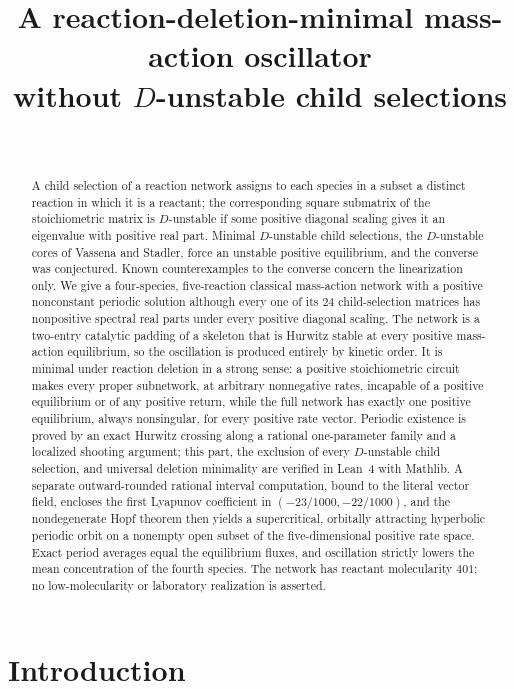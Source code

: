 \documentclass[11pt,a4paper]{article}
\title{A reaction-deletion-minimal mass-action oscillator\\ without $D$-unstable child selections}
\author{\PaperAuthor\\[2pt]\small\PaperAffiliation}
\date{\PaperDate}
\theoremstyle{plain}
\theoremstyle{definition}
\theoremstyle{remark}
\begin{document}
\maketitle

\begin{abstract}
A child selection of a reaction network assigns to each species in a subset a distinct reaction in which it is a reactant; the corresponding square submatrix of the stoichiometric matrix is $D$-unstable if some positive diagonal scaling gives it an eigenvalue with positive real part. Minimal $D$-unstable child selections, the $D$-unstable cores of Vassena and Stadler, force an unstable positive equilibrium, and the converse was conjectured. Known counterexamples to the converse concern the linearization only. We give a four-species, five-reaction classical mass-action network with a positive nonconstant periodic solution although every one of its $24$ child-selection matrices has nonpositive spectral real parts under every positive diagonal scaling. The network is a two-entry catalytic padding of a skeleton that is Hurwitz stable at every positive mass-action equilibrium, so the oscillation is produced entirely by kinetic order. It is minimal under reaction deletion in a strong sense: a positive stoichiometric circuit makes every proper subnetwork, at arbitrary nonnegative rates, incapable of a positive equilibrium or of any positive return, while the full network has exactly one positive equilibrium, always nonsingular, for every positive rate vector. Periodic existence is proved by an exact Hurwitz crossing along a rational one-parameter family and a localized shooting argument; this part, the exclusion of every $D$-unstable child selection, and universal deletion minimality are verified in Lean~4 with Mathlib. A separate outward-rounded rational interval computation, bound to the literal vector field, encloses the first Lyapunov coefficient in $(-23/1000,-22/1000)$, and the nondegenerate Hopf theorem then yields a supercritical, orbitally attracting hyperbolic periodic orbit on a nonempty open subset of the five-dimensional positive rate space. Exact period averages equal the equilibrium fluxes, and oscillation strictly lowers the mean concentration of the fourth species. The network has reactant molecularity $401$; no low-molecularity or laboratory realization is asserted.
\end{abstract}

\section{Introduction}\label{sec:intro}
\end{document}
